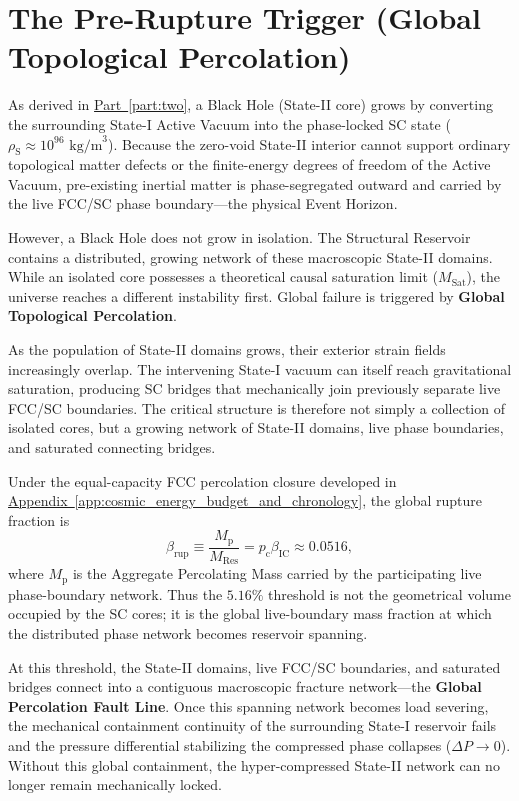 \section{The Pre-Rupture Trigger (Global Topological Percolation)}

As derived in \hyperref[part:two]{Part~\ref{part:two}}, a Black Hole (State-II core) grows by converting the surrounding State-I Active Vacuum into the phase-locked SC state ($\rho_{\mathrm{S}} \approx 10^{96}\text{ kg/m}^3$). Because the zero-void State-II interior cannot support ordinary topological matter defects or the finite-energy degrees of freedom of the Active Vacuum, pre-existing inertial matter is phase-segregated outward and carried by the live FCC/SC phase boundary---the physical Event Horizon.

However, a Black Hole does not grow in isolation. The Structural Reservoir contains a distributed, growing network of these macroscopic State-II domains. While an isolated core possesses a theoretical causal saturation limit ($M_{\mathrm{Sat}}$), the universe reaches a different instability first. Global failure is triggered by \textbf{Global Topological Percolation}.

As the population of State-II domains grows, their exterior strain fields increasingly overlap. The intervening State-I vacuum can itself reach gravitational saturation, producing SC bridges that mechanically join previously separate live FCC/SC boundaries. The critical structure is therefore not simply a collection of isolated cores, but a growing network of State-II domains, live phase boundaries, and saturated connecting bridges.

Under the equal-capacity FCC percolation closure developed in \hyperref[app:cosmic_energy_budget_and_chronology]{Appendix~\ref*{app:cosmic_energy_budget_and_chronology}}, the global rupture fraction is
\begin{equation}
    \beta_{\mathrm{rup}}
    \equiv
    \frac{M_{\mathrm{p}}}{M_{\mathrm{Res}}}
    =
    p_{\mathrm{c}}\beta_{\mathrm{IC}}
    \approx
    0.0516,
\end{equation}
where $M_{\mathrm{p}}$ is the Aggregate Percolating Mass carried by the participating live phase-boundary network. Thus the $5.16\%$ threshold is not the geometrical volume occupied by the SC cores; it is the global live-boundary mass fraction at which the distributed phase network becomes reservoir spanning.

At this threshold, the State-II domains, live FCC/SC boundaries, and saturated bridges connect into a contiguous macroscopic fracture network---the \textbf{Global Percolation Fault Line}. Once this spanning network becomes load severing, the mechanical containment continuity of the surrounding State-I reservoir fails and the pressure differential stabilizing the compressed phase collapses ($\Delta P \longrightarrow 0$). Without this global containment, the hyper-compressed State-II network can no longer remain mechanically locked.

